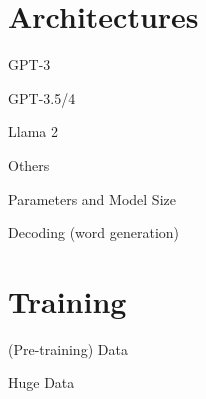 \documentclass[10pt]{beamer}
\begin{document}
\section{Architectures}

\begin{frame}{GPT-3}


\end{frame}

\begin{frame}{GPT-3.5/4}


\end{frame}

\begin{frame}{Llama 2}


\end{frame}


\begin{frame}{Others}


\end{frame}


\begin{frame}{Parameters and Model Size}




\end{frame}


\begin{frame}{Decoding (word generation)}



\end{frame}



\section{Training}

\begin{frame}{(Pre-training) Data}


\end{frame}

\begin{frame}{Huge Data}


\end{frame}
\end{document}
